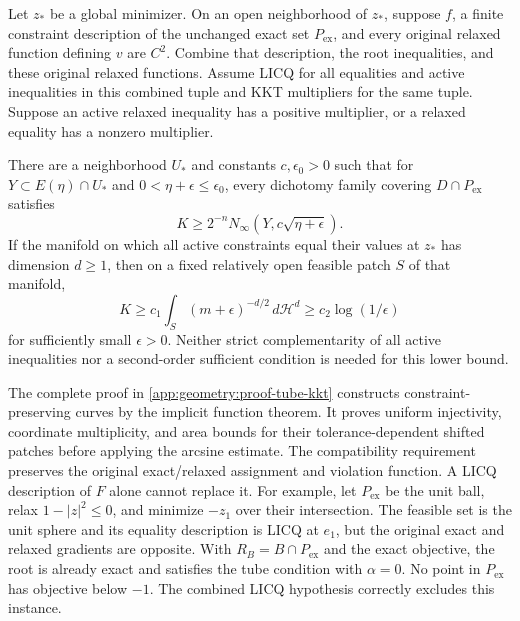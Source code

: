 \begin{theorem}
\label{geom:thm-tube-kkt}
Let $z_*$ be a global minimizer. On an open neighborhood of $z_*$,
suppose $f$, a finite constraint description of the unchanged exact set
$P_{\mathrm{ex}}$, and every original relaxed function defining $v$
are $C^2$. Combine that description, the root inequalities, and these
original relaxed functions. Assume LICQ for all equalities and active
inequalities in this combined tuple and KKT multipliers for the same
tuple. Suppose an active relaxed inequality has a positive multiplier,
or a relaxed equality has a nonzero multiplier.

There are a neighborhood $U_*$ and constants $c,\epsilon_0>0$ such that
for $Y\subset E(\eta)\cap U_*$ and $0<\eta+\epsilon\leq\epsilon_0$,
every dichotomy family covering $D\cap P_{\mathrm{ex}}$ satisfies
\begin{equation}\label{geom:eq-local-tube-cover}
 K\geq2^{-n}N_\infty(Y,c\sqrt{\eta+\epsilon}).
\end{equation}
If the manifold on which all active constraints equal their values at
$z_*$ has dimension $d\geq1$, then on a fixed relatively open feasible
patch $S$ of that manifold,
\begin{equation}\label{geom:eq-tube-integral}
 K\geq c_1\int_S(m+\epsilon)^{-d/2}\,d\mathcal H^d
             \geq c_2\log(1/\epsilon)
\end{equation}
for sufficiently small $\epsilon>0$. Neither strict complementarity
of all active inequalities nor a second-order sufficient condition is
needed for this lower bound.
\end{theorem}

The complete proof in \cref{app:geometry:proof-tube-kkt} constructs
constraint-preserving curves by the implicit function theorem. It proves
uniform injectivity, coordinate multiplicity, and area bounds for their
tolerance-dependent shifted patches before applying the arcsine estimate.
The compatibility requirement preserves the original exact/relaxed
assignment and violation function. A LICQ description of $F$ alone
cannot replace it. For example, let $P_{\mathrm{ex}}$ be the unit ball,
relax $1-|z|^2\leq0$, and minimize $-z_1$ over their intersection.
The feasible set is the unit sphere and its equality description is
LICQ at $e_1$, but the original exact and relaxed gradients are opposite.
With $R_B=B\cap P_{\mathrm{ex}}$ and the exact objective, the root is
already exact and satisfies the tube condition with $\alpha=0$.
No point in $P_{\mathrm{ex}}$ has objective below $-1$. The combined
LICQ hypothesis correctly excludes this instance.

